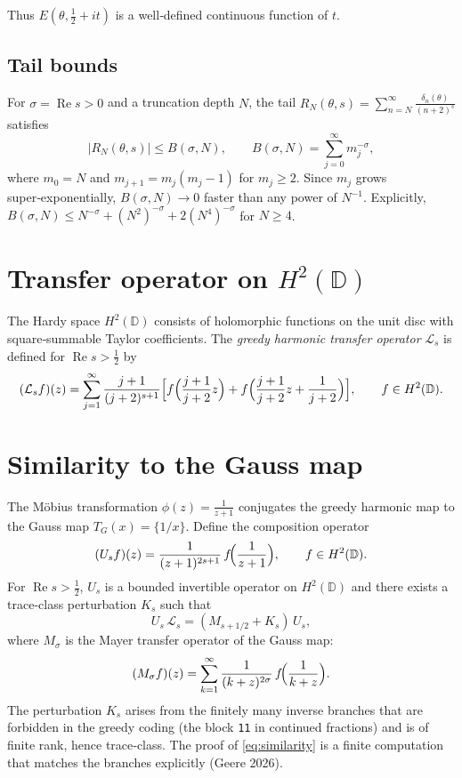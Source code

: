 \documentclass[12pt,a4paper]{article}
\theoremstyle{remark}
\begin{document}
Thus $E(\theta,\frac12+it)$ is a well‑defined continuous function of $t$.

\subsection{Tail bounds}
For $\sigma=\operatorname{Re}s>0$ and a truncation depth $N$,
the tail $R_N(\theta,s)=\sum_{n=N}^\infty\frac{\delta_n(\theta)}{(n+2)^s}$ satisfies
\[
|R_N(\theta,s)|\le B(\sigma,N),\qquad
B(\sigma,N)=\sum_{j=0}^\infty m_j^{-\sigma},
\]
where $m_0=N$ and $m_{j+1}=m_j(m_j-1)$ for $m_j\ge2$.
Since $m_j$ grows super‑exponentially, $B(\sigma,N)\to0$ faster than any power of $N^{-1}$.
Explicitly, $B(\sigma,N)\le N^{-\sigma}+(N^2)^{-\sigma}+2(N^4)^{-\sigma}$ for $N\ge4$.

\section{Transfer operator on $H^2(\mathbb D)$}
\label{sec:transfer}

The Hardy space $H^2(\mathbb D)$ consists of holomorphic functions on the unit disc with square‑summable Taylor coefficients.
The \emph{greedy harmonic transfer operator} $\mathcal L_s$ is defined for $\operatorname{Re}s>\frac12$ by
\[
(\mathcal L_s f)(z)=\sum_{j=1}^\infty\frac{j+1}{(j+2)^{s+1}}
\Bigl[ f\Bigl(\frac{j+1}{j+2}z\Bigr)+f\Bigl(\frac{j+1}{j+2}z+\frac1{j+2}\Bigr) \Bigr],
\qquad f\in H^2(\mathbb D).
\]

\section{Similarity to the Gauss map}
\label{sec:similarity}

The M\"obius transformation $\phi(z)=\frac1{z+1}$ conjugates the greedy harmonic map to the Gauss map $T_G(x)=\{1/x\}$.
Define the composition operator
\[
(U_s f)(z)=\frac{1}{(z+1)^{2s+1}}\, f\!\Bigl(\frac1{z+1}\Bigr),\qquad f\in H^2(\mathbb D).
\]
For $\operatorname{Re}s>\frac12$, $U_s$ is a bounded invertible operator on $H^2(\mathbb D)$ and there exists a trace‑class perturbation $K_s$ such that
\begin{equation}\label{eq:similarity}
U_s\,\mathcal L_s = (M_{s+1/2}+K_s)\,U_s,
\end{equation}
where $M_\sigma$ is the Mayer transfer operator of the Gauss map:
\[
(M_\sigma f)(z)=\sum_{k=1}^\infty\frac{1}{(k+z)^{2\sigma}}\, f\!\Bigl(\frac1{k+z}\Bigr).
\]
The perturbation $K_s$ arises from the finitely many inverse branches that are forbidden in the greedy coding (the block \texttt{11} in continued fractions) and is of finite rank, hence trace‑class.
The proof of \eqref{eq:similarity} is a finite computation that matches the branches explicitly (Geere 2026).
\end{document}
